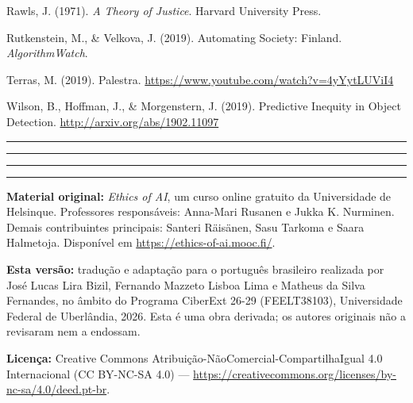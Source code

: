 \documentclass[
  11pt,
]{article}
\newcommand{\faixaEixos}[1][\linewidth]{%
  \noindent
  \textcolor{iaConceitos}{\rule{0.3333#1}{4pt}}%
  \textcolor{iaAplic}{\rule{0.3333#1}{4pt}}%
  \textcolor{iaRiscos}{\rule{0.3333#1}{4pt}}%
  \par}
\newenvironment{licenca}
  {\par\vspace{2em}\faixaEixos\par\vspace{0.8em}
   \begingroup\sffamily\scriptsize\color{iaTintaFraca}}
  {\endgroup\par}
\begin{document}
Rawls, J. (1971). \emph{A Theory of Justice}. Harvard University Press.

Rutkenstein, M., \& Velkova, J. (2019). Automating Society: Finland.
\emph{AlgorithmWatch}.

Terras, M. (2019). Palestra.
\url{https://www.youtube.com/watch?v=4yYytLUViI4}

Wilson, B., Hoffman, J., \& Morgenstern, J. (2019). Predictive Inequity
in Object Detection. \url{http://arxiv.org/abs/1902.11097}

\begin{center}\rule{0.5\linewidth}{0.5pt}\end{center}

\begin{licenca}

\textbf{Material original:} \emph{Ethics of AI}, um curso online
gratuito da Universidade de Helsinque. Professores responsáveis:
Anna-Mari Rusanen e Jukka K. Nurminen. Demais contribuintes principais:
Santeri Räisänen, Sasu Tarkoma e Saara Halmetoja. Disponível em
\url{https://ethics-of-ai.mooc.fi/}.

\textbf{Esta versão:} tradução e adaptação para o português brasileiro
realizada por José Lucas Lira Bizil, Fernando Mazzeto Lisboa Lima e
Matheus da Silva Fernandes, no âmbito do Programa CiberExt 26-29
(FEELT38103), Universidade Federal de Uberlândia, 2026. Esta é uma obra
derivada; os autores originais não a revisaram nem a endossam.

\textbf{Licença:} Creative Commons
Atribuição-NãoComercial-CompartilhaIgual 4.0 Internacional (CC BY-NC-SA
4.0) ---
\url{https://creativecommons.org/licenses/by-nc-sa/4.0/deed.pt-br}.

\end{licenca}
\end{document}
